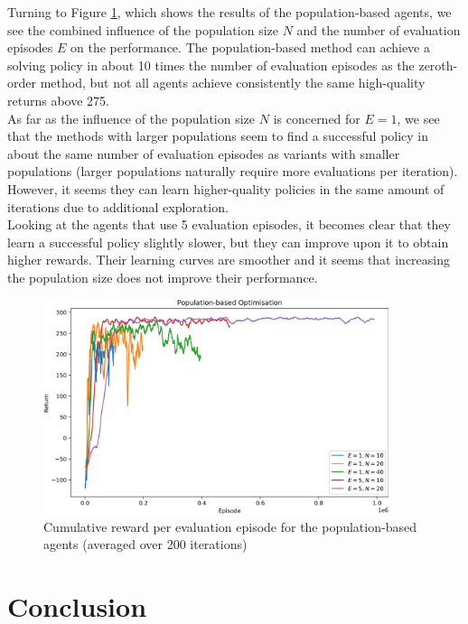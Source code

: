 \documentclass[10pt]{article}
\begin{document}
Turning to Figure \ref{fig:population}, which shows the results of the population-based
agents, we see the combined influence of the population size $N$ and the number of
evaluation episodes $E$ on the performance.
The population-based method can achieve a solving policy in about 10 times the number of
evaluation episodes as the zeroth-order method, but not all agents achieve consistently
the same high-quality returns above 275.\\
As far as the influence of the population size $N$ is concerned for $E=1$, we see that
the methods with larger populations seem to find a successful policy in about the same
number of evaluation episodes as variants with smaller populations (larger populations
naturally require more evaluations per iteration).
However, it seems they can learn higher-quality policies in the same amount of iterations
due to additional exploration.\\
Looking at the agents that use 5 evaluation episodes, it becomes clear that they learn a
successful policy slightly slower, but they can improve upon it to obtain higher rewards.
Their learning curves are smoother and it seems that increasing the population size does
not improve their performance.

\begin{figure}[h] \centering
    \includegraphics[width=0.9\textwidth]{checkpoints/FINAL/population.png}
    \caption{Cumulative reward per evaluation episode for the population-based agents
        (averaged over 200 iterations)} \label{fig:population}
\end{figure}

\section{Conclusion}
\end{document}
